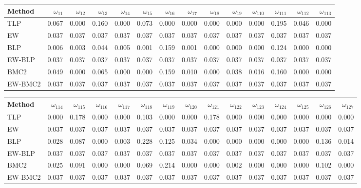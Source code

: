 \documentclass[
]{article}
\begin{document}
\begin{tabular}{lrrrrrrrrrrrrr}
\toprule
Method & $\omega_{11}$ & $\omega_{12}$ & $\omega_{13}$ & $\omega_{14}$ & $\omega_{15}$ & $\omega_{16}$ & $\omega_{17}$ & $\omega_{18}$ & $\omega_{19}$ & $\omega_{110}$ & $\omega_{111}$ & $\omega_{112}$ & $\omega_{113}$\\
\midrule
TLP & 0.067 & 0.000 & 0.160 & 0.000 & 0.073 & 0.000 & 0.000 & 0.000 & 0.000 & 0.000 & 0.195 & 0.046 & 0.000\\
EW & 0.037 & 0.037 & 0.037 & 0.037 & 0.037 & 0.037 & 0.037 & 0.037 & 0.037 & 0.037 & 0.037 & 0.037 & 0.037\\
BLP & 0.006 & 0.003 & 0.044 & 0.005 & 0.001 & 0.159 & 0.001 & 0.000 & 0.000 & 0.000 & 0.124 & 0.000 & 0.000\\
EW-BLP & 0.037 & 0.037 & 0.037 & 0.037 & 0.037 & 0.037 & 0.037 & 0.037 & 0.037 & 0.037 & 0.037 & 0.037 & 0.037\\
BMC2 & 0.049 & 0.000 & 0.065 & 0.000 & 0.000 & 0.159 & 0.010 & 0.000 & 0.038 & 0.016 & 0.160 & 0.000 & 0.000\\
EW-BMC2 & 0.037 & 0.037 & 0.037 & 0.037 & 0.037 & 0.037 & 0.037 & 0.037 & 0.037 & 0.037 & 0.037 & 0.037 & 0.037\\
\bottomrule
\end{tabular}

\begin{tabular}{lrrrrrrrrrrrrrr}
\toprule
Method & $\omega_{114}$ & $\omega_{115}$ & $\omega_{116}$ & $\omega_{117}$ & $\omega_{118}$ & $\omega_{119}$ & $\omega_{120}$ & $\omega_{121}$ & $\omega_{122}$ & $\omega_{123}$ & $\omega_{124}$ & $\omega_{125}$ & $\omega_{126}$ & $\omega_{127}$\\
\midrule
TLP & 0.000 & 0.178 & 0.000 & 0.000 & 0.103 & 0.000 & 0.000 & 0.178 & 0.000 & 0.000 & 0.000 & 0.000 & 0.000 & 0.000\\
EW & 0.037 & 0.037 & 0.037 & 0.037 & 0.037 & 0.037 & 0.037 & 0.037 & 0.037 & 0.037 & 0.037 & 0.037 & 0.037 & 0.037\\
BLP & 0.028 & 0.087 & 0.000 & 0.003 & 0.228 & 0.125 & 0.034 & 0.000 & 0.000 & 0.000 & 0.000 & 0.000 & 0.136 & 0.014\\
EW-BLP & 0.037 & 0.037 & 0.037 & 0.037 & 0.037 & 0.037 & 0.037 & 0.037 & 0.037 & 0.037 & 0.037 & 0.037 & 0.037 & 0.037\\
BMC2 & 0.025 & 0.091 & 0.000 & 0.000 & 0.069 & 0.214 & 0.000 & 0.000 & 0.002 & 0.000 & 0.000 & 0.000 & 0.102 & 0.000\\
EW-BMC2 & 0.037 & 0.037 & 0.037 & 0.037 & 0.037 & 0.037 & 0.037 & 0.037 & 0.037 & 0.037 & 0.037 & 0.037 & 0.037 & 0.037\\
\bottomrule
\end{tabular}
\end{document}
